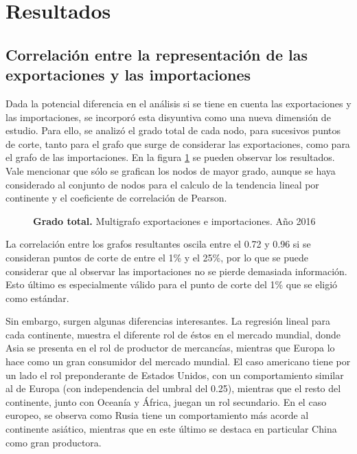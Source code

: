 \documentclass[class=article, crop=false]{standalone}
\begin{document}
\section{Resultados}


\subsection{Correlación entre la representación de las exportaciones y las importaciones}

Dada la potencial diferencia en el análisis si se tiene en cuenta las exportaciones y las importaciones, se incorporó esta disyuntiva como una nueva dimensión de estudio. Para ello, se analizó el grado total de cada nodo, para sucesivos puntos de corte, tanto para el grafo que surge de considerar las exportaciones, como para el grafo de las importaciones. En la figura \ref{fig:corr} se pueden observar los resultados. Vale mencionar que sólo se grafican los nodos de mayor grado, aunque se haya considerado al conjunto de nodos para el calculo de la tendencia lineal por continente y el coeficiente de correlación de Pearson.


\begin{figure}
\centering
{}
\caption{\textbf{Grado total.} Multigrafo exportaciones e importaciones. Año 2016}
\label{fig:corr}
\end{figure}


La correlación entre los grafos resultantes oscila entre el 0.72 y 0.96 si se consideran puntos de corte de entre el 1\% y el 25\%, por lo que se puede considerar que al observar las importaciones no se pierde demasiada información. Esto último es especialmente válido para el punto de corte del 1\% que se eligió como estándar. 

Sin embargo, surgen algunas diferencias interesantes. La regresión lineal para cada continente, muestra el diferente rol de éstos en el mercado mundial, donde Asia se presenta en el rol de productor de mercancías, mientras que Europa lo hace como un gran consumidor del mercado mundial. El caso americano tiene por un lado el rol preponderante de Estados Unidos, con un comportamiento similar al de Europa (con independencia del umbral del 0.25), mientras que el resto del continente, junto con Oceanía y África, juegan un rol secundario. En el caso europeo, se observa como Rusia tiene un comportamiento más acorde al continente asiático, mientras que en este último se destaca en particular China como gran productora.      
\end{document}
